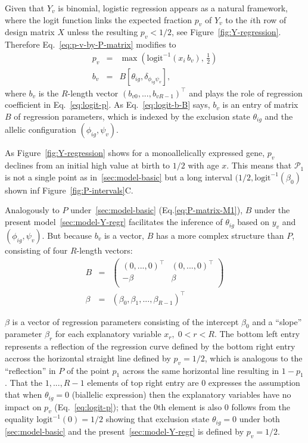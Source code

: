 \documentclass[letterpaper]{article}
\begin{document}
Given that \(Y_v\) is binomial, logistic regression appears as a natural
framework, where the logit function links the expected fraction \(p_v\) of
\(Y_v\) to the \(i\)th row of design matrix \(X\) unless the resulting
\(p_v<1/2\), see Figure~\ref{fig:Y-regression}.  Therefore Eq.~\ref{eq:p-v-by-P-matrix} modifies to
\begin{eqnarray}
\label{eq:logit-p}
p_v &=& \max \left( \mathrm{logit}^{-1}(x_i\, b_v), \, \frac{1}{2} \right) \\
\label{eq:logit-b-B}
b_v &=& B[\theta_{ig},\delta_{\phi_{ig}\psi_v}],
\end{eqnarray}
where \(b_v\) is the
\(R\)-length vector \((b_{v0},...,b_{vR-1})^\top\) and plays the role of
regression coefficient in Eq.~\ref{eq:logit-p}. As Eq.~\ref{eq:logit-b-B}
says, \(b_v\) is an entry of matrix \(B\) of regression parameters,
which is indexed by the exclusion state \(\theta_{ig}\) and the allelic configuration
\((\phi_{ig},\psi_v)\).

As Figure~\ref{fig:Y-regression} shows for a monoallelically expressed gene,
\(p_v\) declines from an initial high value at birth to \(1/2\) with age
\(x\).  This means that \(\mathcal{P}_1\) is not a single point as
in~\ref{sec:model-basic} but a long interval \((1/2,
\mathrm{logit}^{-1}(\beta_0)\) shown inf Figure~\ref{fig:P-intervals}C.

Analogously to \(P\) under~\ref{sec:model-basic} (Eq.\ref{eq:P-matrix-M1}),
\(B\) under the present model~\ref{sec:model-Y-regr} facilitates the inference
of \(\theta_{ig}\) based on \(y_v\) and \((\phi_{ig},\psi_v)\).  But because
\(b_v\) is a vector, \(B\) has a more complex structure than \(P\), consisting
of four \(R\)-length vectors:
\begin{eqnarray}
\label{eq:B-matrix-M2}
B &=&
\begin{pmatrix}
(0,...,0)^\top & (0,...,0)^\top \\
-\beta
&
\beta
\\
\end{pmatrix}
\\
\beta &=& (\beta_0,\beta_1,...,\beta_{R-1})^\top
\end{eqnarray}

\(\beta\) is a vector of regression parameters
consisting of the intercept \(\beta_0\) and a ``slope'' parameter
\(\beta_{r}\) for each explanatory variable \(x_r, \; 0<r<R\).
The bottom left entry represents a reflection of the regression curve defined
by the bottom right entry accross the horizontal straight line defined by \(p_v=1/2\),
which is analogous to the ``reflection'' in \(P\) of the point \(p_1\) across the same
horizontal line resulting in \(1-p_1\).
That the \(1,...,R-1\) elements of top right entry are \(0\) expresses the
assumption that when \(\theta_{ig}=0\) (biallelic expression) then the
explanatory variables have no impact on \(p_v\) (Eq.~\ref{eq:logit-p}); that
the \(0\)th element is also \(0\) follows from the equality
\(\mathrm{logit}^{-1}(0)=1/2\) showing that exclusion state \(\theta_{ig}=0\)
under both \ref{sec:model-basic} and the present~\ref{sec:model-Y-regr}
is defined by \(p_v=1/2\).
\end{document}
